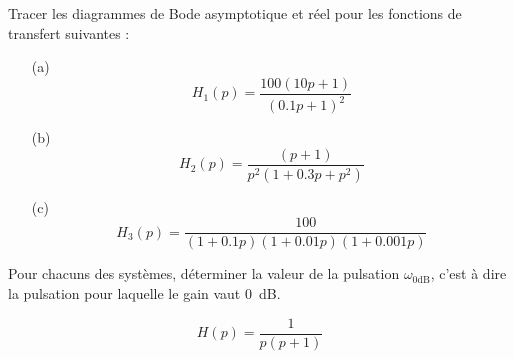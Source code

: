 \question{}
Tracer les diagrammes de Bode asymptotique et réel pour les fonctions de 
transfert suivantes :
\begin{itemize}
    \item[(a)]
\[
    H_1(p)=\dfrac{100(10p+1)}{(0.1p+1)^2}
\]
    \item[(b)]
\[
    H_2(p)=\dfrac{(p+1)}{p^2(1+0.3p+p^2)} 
\]
    \item[(c)]
\[
    H_3(p)=\dfrac{100}{(1+0.1p)(1+0.01p)(1+0.001p)}
\]
\end{itemize}
\question{}
Pour chacuns des systèmes, déterminer la valeur de la pulsation 
$\omega_{0\si{\dB}}$, c'est à dire la pulsation pour laquelle le gain 
vaut 0~\si{\dB}.


\[
    H(p)=\dfrac{1}{p(p+1)               }
\]

